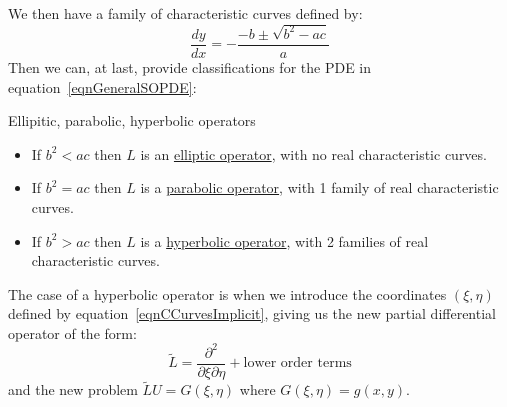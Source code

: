 \documentclass[../Main.tex]{subfiles}
\begin{document}
We then have a family of characteristic curves defined by:
\begin{equation}
    \frac{dy}{dx} = -\frac{-b \pm \sqrt{b^2 - ac}}{a}
    \label{eqnCCurvesImplicit}
\end{equation}
Then we can, at last, provide classifications for the PDE in equation~\ref{eqnGeneralSOPDE}:
\begin{definition}{Ellipitic, parabolic, hyperbolic operators}
    \begin{itemize}
        \item If $b^2 < ac$ then $L$ is an \underline{elliptic operator}, with no real characteristic curves.
        \item If $b^2 = ac$ then $L$ is a \underline{parabolic operator}, with 1 family of real characteristic curves.
        \item If $b^2 > ac$ then $L$ is a \underline{hyperbolic operator}, with 2 families of real characteristic curves.
    \end{itemize}
\end{definition}
The case of a hyperbolic operator is when we introduce the coordinates $(\xi, \eta)$ defined by equation~\ref{eqnCCurvesImplicit}, giving us the new partial differential operator of the form:
\begin{equation*}
    \tilde{L} = \frac{\partial^{2}}{\partial \xi\partial \eta} + \text{lower order terms}
\end{equation*}
and the new problem $\tilde{L}U = G(\xi, \eta)$ where $G(\xi, \eta) = g(x, y)$.
\end{document}
